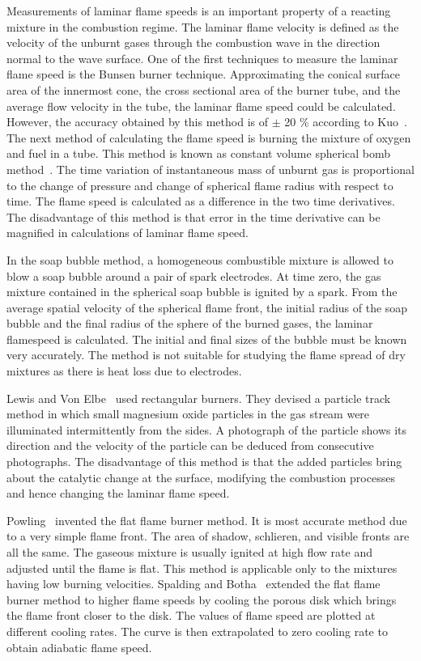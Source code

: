 Measurements of laminar flame speeds is an important property of a
reacting mixture in the combustion regime. The laminar flame velocity is defined as the
velocity of the unburnt gases through the combustion wave in the
direction normal to the wave surface. One of the first techniques to measure the laminar flame
speed is the Bunsen burner technique. Approximating the conical
surface area of the innermost cone, the cross sectional area of the
burner tube, and the average flow velocity in the tube, the laminar flame
speed could be calculated. However, the accuracy obtained by this
method is of $\pm $ 20 \% according to Kuo~\cite{Kuo}. The next method
of calculating the flame speed is burning the mixture of oxygen
and fuel in a tube. This method is known as constant volume spherical
bomb method~\cite{Kuo}. The time variation of instantaneous mass of
unburnt gas is proportional to the change of pressure and change of
spherical flame radius with respect to time. The flame speed is
calculated as a difference in the two time derivatives. The
disadvantage of this method is that error in the time derivative can be
magnified in calculations of laminar flame speed.

 In the soap bubble method, a homogeneous combustible mixture is
allowed to blow a soap bubble around a pair of spark electrodes. At
time zero, the gas mixture contained in the spherical soap bubble is
ignited by a spark. From the average spatial velocity of the spherical
flame front, the initial radius of the soap bubble and the final
radius of the sphere of the burned gases, the laminar flamespeed is
calculated. The initial and final sizes of the bubble must be known
very accurately. The method is not suitable for studying the flame
spread of dry mixtures as there is heat loss due to electrodes.

 Lewis and Von Elbe~\cite{lewis} used rectangular
burners. They devised a particle track method in which small magnesium
oxide particles in the gas stream were illuminated intermittently from the
sides. A photograph of the particle shows its direction and the
velocity of the particle can be deduced from consecutive
photographs. The disadvantage of this method is that the added
particles bring about the catalytic change at the surface, modifying the combustion
processes and hence changing the laminar flame speed.

 Powling~\cite{powling} invented the flat flame burner
method. It is most accurate method due to a very simple flame
front. The area of shadow, schlieren, and visible fronts are all the
same. The gaseous mixture is usually ignited at high flow rate and
adjusted until the flame is flat. This method is applicable only to
the mixtures having low burning velocities. Spalding and
Botha~\cite{spalding} extended the flat flame burner method to higher flame
speeds by cooling the porous disk which brings the flame front closer to
the disk. The values of flame speed are plotted at different cooling
rates. The curve is then extrapolated to zero cooling rate to obtain
adiabatic flame speed.


